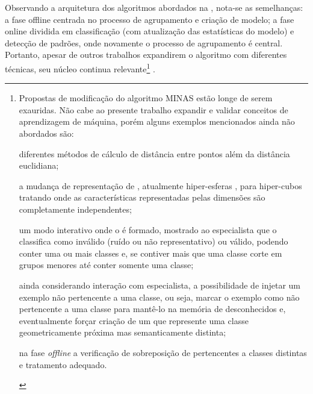 Observando a arquitetura dos algoritmos abordados na , nota-se as semelhanças:
a fase offline centrada no processo de agrupamento e criação de modelo;
a fase online dividida em classificação (com atualização das estatísticas do modelo)
e detecção de padrões, onde novamente o processo de agrupamento é central.
Portanto, apesar de outros trabalhos expandirem o algoritmo com diferentes técnicas, seu
núcleo continua relevante\footnote{
Propostas de modificação do algoritmo MINAS estão longe de serem exauridas.
Não cabe ao presente trabalho expandir e validar conceitos de aprendizagem de máquina,
porém alguns exemplos mencionados ainda não abordados são:
\begin{enumerate*}[label={\alph*)}]
    
    \item diferentes métodos de cálculo de distância entre pontos além da
    distância euclidiana;
    
    \item a mudança de representação de \clusters, atualmente hiper-esferas
    \cite{Costa2019thesis}, para hiper-cubos tratando \datasets onde as
    características representadas pelas dimensões são completamente
    independentes;
    
    \item um modo interativo onde o \cluster é formado, mostrado ao especialista
    que o classifica como inválido (ruído ou não representativo) ou válido,
    podendo conter uma ou mais classes e, se contiver mais que uma classe corte em
    grupos menores até conter somente uma classe;
    
    \item ainda considerando interação com especialista, a possibilidade de
    injetar um exemplo não pertencente a uma classe, ou seja, marcar o exemplo
    como não pertencente a uma classe para mantê-lo na memória de
    desconhecidos e, eventualmente forçar criação de um \cluster que represente
    uma classe geometricamente próxima mas semanticamente distinta;
    
    \item na fase \emph{offline} a verificação de sobreposição de \clusters
    pertencentes a classes distintas e tratamento adequado.

\end{enumerate*}
} \cite{DaSilva2018,DaSilva2018thesis,Costa2019}.



